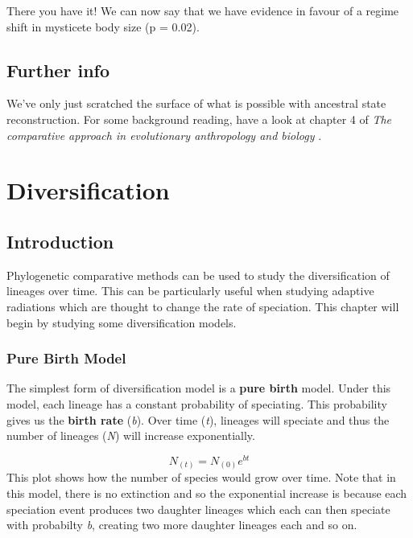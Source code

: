 \documentclass[
]{book}
\begin{document}
There you have it! We can now say that we have evidence in favour of a regime shift in mysticete body size (p = 0.02).

\hypertarget{further-info-3}{%
\section{Further info}\label{further-info-3}}

We've only just scratched the surface of what is possible with ancestral state reconstruction. For some background reading, have a look at chapter 4 of \emph{The comparative approach in evolutionary anthropology and biology} \citep{Nunn11}.

\hypertarget{diversification}{%
\chapter{Diversification}\label{diversification}}

\hypertarget{introduction}{%
\section{Introduction}\label{introduction}}

Phylogenetic comparative methods can be used to study the diversification of lineages over time. This can be particularly useful when studying adaptive radiations which are thought to change the rate of speciation. This chapter will begin by studying some diversification models.

\hypertarget{pure-birth-model}{%
\subsection{Pure Birth Model}\label{pure-birth-model}}

The simplest form of diversification model is a \textbf{pure birth} model. Under this model, each lineage has a constant probability of speciating. This probability gives us the \textbf{birth rate} (\emph{b}). Over time (\emph{t}), lineages will speciate and thus the number of lineages (\emph{N}) will increase exponentially.

\[ N_{(t)} = N_{(0)}e^{bt} \]
This plot shows how the number of species would grow over time. Note that in this model, there is no extinction and so the exponential increase is because each speciation event produces two daughter lineages which each can then speciate with probabilty \emph{b}, creating two more daughter lineages each and so on.
\end{document}
